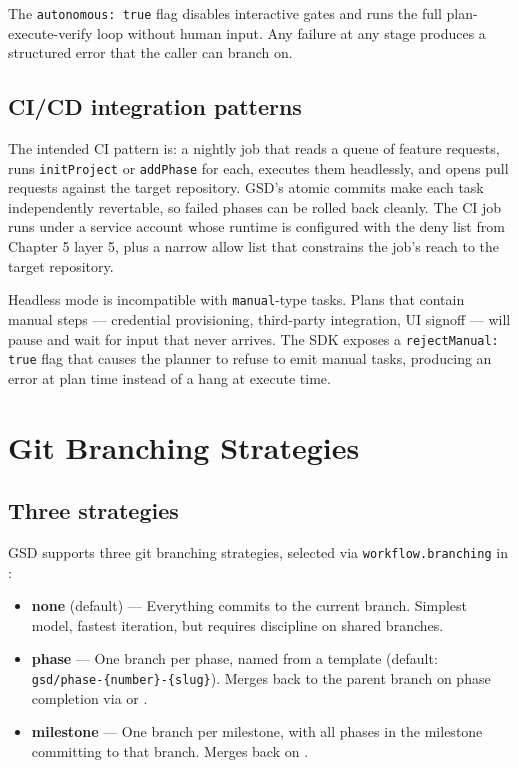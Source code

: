 \documentclass[11pt,letterpaper,openany]{book}
\begin{document}
The \texttt{autonomous: true} flag disables interactive gates and runs the full plan-execute-verify loop without human input. Any failure at any stage produces a structured error that the caller can branch on.

\section{CI/CD integration patterns}

The intended CI pattern is: a nightly job that reads a queue of feature requests, runs \texttt{initProject} or \texttt{addPhase} for each, executes them headlessly, and opens pull requests against the target repository. GSD's atomic commits make each task independently revertable, so failed phases can be rolled back cleanly. The CI job runs under a service account whose runtime is configured with the deny list from Chapter 5 layer 5, plus a narrow allow list that constrains the job's reach to the target repository.

Headless mode is incompatible with \texttt{manual}-type tasks. Plans that contain manual steps — credential provisioning, third-party integration, UI signoff — will pause and wait for input that never arrives. The SDK exposes a \texttt{rejectManual: true} flag that causes the planner to refuse to emit manual tasks, producing an error at plan time instead of a hang at execute time.

\chapter{Git Branching Strategies}

\section{Three strategies}

GSD supports three git branching strategies, selected via \texttt{workflow.branching} in :

\begin{itemize}[leftmargin=1.2em]
  \item \textbf{none} (default) — Everything commits to the current branch. Simplest model, fastest iteration, but requires discipline on shared branches.
  \item \textbf{phase} — One branch per phase, named from a template (default: \texttt{gsd/phase-\{number\}-\{slug\}}). Merges back to the parent branch on phase completion via  or .
  \item \textbf{milestone} — One branch per milestone, with all phases in the milestone committing to that branch. Merges back on .
\end{itemize}
\end{document}
